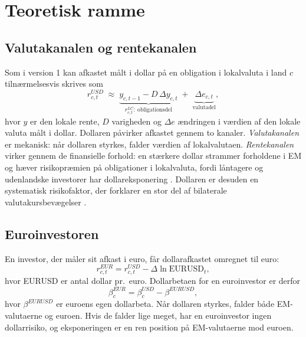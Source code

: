 \documentclass[11pt,a4paper]{article}
\begin{document}
\section{Teoretisk ramme}

\subsection{Valutakanalen og rentekanalen}
Som i version 1 kan afkastet målt i dollar på en obligation i lokalvaluta i land $c$ tilnærmelsesvis skrives som
\begin{equation}
r^{USD}_{c,t} \;\approx\; \underbrace{y_{c,t-1} - D\,\Delta y_{c,t}}_{r^{LC}_{c,t}:\ \text{obligationsdel}} \;+\; \underbrace{\Delta e_{c,t}}_{\text{valutadel}},
\label{eq:dekomp}
\end{equation}
hvor $y$ er den lokale rente, $D$ varigheden og $\Delta e$ ændringen i værdien af den lokale valuta målt i dollar. Dollaren påvirker afkastet gennem to kanaler. \emph{Valutakanalen} er mekanisk: når dollaren styrkes, falder værdien af lokalvalutaen. \emph{Rentekanalen} virker gennem de finansielle forhold: en stærkere dollar strammer forholdene i EM og hæver risikopræmien på obligationer i lokalvaluta, fordi låntagere og udenlandske investorer har dollareksponering \citep{hofmann2020,avdjiev2019}. Dollaren er desuden en systematisk risikofaktor, der forklarer en stor del af bilaterale valutakursbevægelser \citep{verdelhan2018}.

\subsection{Euroinvestoren}
En investor, der måler sit afkast i euro, får dollarafkastet omregnet til euro:
\begin{equation}
r^{EUR}_{c,t} = r^{USD}_{c,t} - \Delta \ln \text{EURUSD}_t,
\label{eq:eur}
\end{equation}
hvor EURUSD er antal dollar pr.\ euro. Dollarbetaen for en euroinvestor er derfor
\begin{equation}
\beta^{EUR}_c = \beta^{USD}_c - \beta^{EURUSD},
\label{eq:betaeur}
\end{equation}
hvor $\beta^{EURUSD}$ er euroens egen dollarbeta. Når dollaren styrkes, falder både EM-valutaerne og euroen. Hvis de falder lige meget, har en euroinvestor ingen dollarrisiko, og eksponeringen er en ren position på EM-valutaerne mod euroen.
\end{document}
